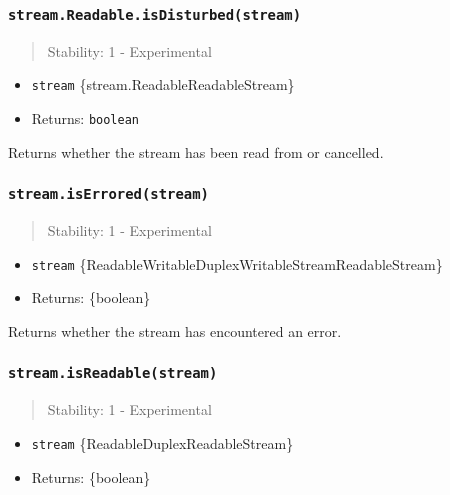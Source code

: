\subsubsection{\texorpdfstring{\texttt{stream.Readable.isDisturbed(stream)}}{stream.Readable.isDisturbed(stream)}}\label{stream.readable.isdisturbedstream}

\begin{quote}
Stability: 1 - Experimental
\end{quote}

\begin{itemize}
\tightlist
\item
  \texttt{stream} \{stream.Readable\textbar ReadableStream\}
\item
  Returns: \texttt{boolean}
\end{itemize}

Returns whether the stream has been read from or cancelled.

\subsubsection{\texorpdfstring{\texttt{stream.isErrored(stream)}}{stream.isErrored(stream)}}\label{stream.iserroredstream}

\begin{quote}
Stability: 1 - Experimental
\end{quote}

\begin{itemize}
\tightlist
\item
  \texttt{stream}
  \{Readable\textbar Writable\textbar Duplex\textbar WritableStream\textbar ReadableStream\}
\item
  Returns: \{boolean\}
\end{itemize}

Returns whether the stream has encountered an error.

\subsubsection{\texorpdfstring{\texttt{stream.isReadable(stream)}}{stream.isReadable(stream)}}\label{stream.isreadablestream}

\begin{quote}
Stability: 1 - Experimental
\end{quote}

\begin{itemize}
\tightlist
\item
  \texttt{stream} \{Readable\textbar Duplex\textbar ReadableStream\}
\item
  Returns: \{boolean\}
\end{itemize}

